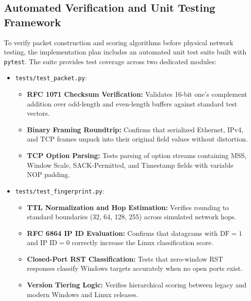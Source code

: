 \documentclass[11pt,a4paper]{article}
\begin{document}
\subsection{Automated Verification and Unit Testing Framework}
To verify packet construction and scoring algorithms before physical network testing, the implementation plan includes an automated unit test suite built with \texttt{pytest}. The suite provides test coverage across two dedicated modules:

\begin{itemize}[nosep, itemsep=2pt, leftmargin=1.5em]
    \item \texttt{tests/test\_packet.py}:
    \begin{itemize}
        \item \textbf{RFC 1071 Checksum Verification:} Validates 16-bit one's complement addition over odd-length and even-length buffers against standard test vectors.
        \item \textbf{Binary Framing Roundtrip:} Confirms that serialized Ethernet, IPv4, and TCP frames unpack into their original field values without distortion.
        \item \textbf{TCP Option Parsing:} Tests parsing of option streams containing MSS, Window Scale, SACK-Permitted, and Timestamp fields with variable NOP padding.
    \end{itemize}
    \item \texttt{tests/test\_fingerprint.py}:
    \begin{itemize}
        \item \textbf{TTL Normalization and Hop Estimation:} Verifies rounding to standard boundaries (32, 64, 128, 255) across simulated network hops.
        \item \textbf{RFC 6864 IP ID Evaluation:} Confirms that datagrams with $\text{DF}=1$ and $\text{IP ID}=0$ correctly increase the Linux classification score.
        \item \textbf{Closed-Port RST Classification:} Tests that zero-window RST responses classify Windows targets accurately when no open ports exist.
        \item \textbf{Version Tiering Logic:} Verifies hierarchical scoring between legacy and modern Windows and Linux releases.
    \end{itemize}
\end{itemize}

\end{document}
